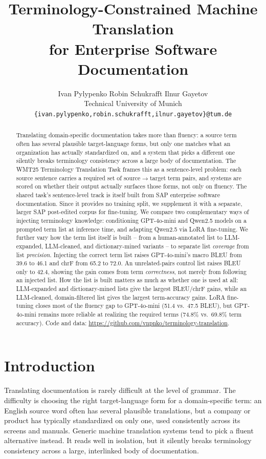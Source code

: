 \documentclass[11pt]{article}
\title{Terminology-Constrained Machine Translation \\ for Enterprise Software Documentation}
\author{Ivan Pylypenko \quad Robin Schukrafft \quad Ilnur Gayetov \\
  Technical University of Munich \\
  \texttt{\{ivan.pylypenko,robin.schukrafft,ilnur.gayetov\}@tum.de}}
\begin{document}
\maketitle

\begin{abstract}
Translating domain-specific documentation takes more than fluency: a source term often has several plausible target-language forms, but only one matches what an organization has actually standardized on, and a system that picks a different one silently breaks terminology consistency across a large body of documentation. The WMT25 Terminology Translation Task frames this as a sentence-level problem: each source sentence carries a required set of source$\to$target term pairs, and systems are scored on whether their output actually surfaces those forms, not only on fluency. The shared task's sentence-level track is itself built from SAP enterprise software documentation. Since it provides no training split, we supplement it with a separate, larger SAP post-edited corpus for fine-tuning. We compare two complementary ways of injecting terminology knowledge: conditioning GPT-4o-mini and Qwen2.5 models on a prompted term list at inference time, and adapting Qwen2.5 via LoRA fine-tuning. We further vary how the term list itself is built -- from a human-annotated list to LLM-expanded, LLM-cleaned, and dictionary-mined variants -- to separate list \emph{coverage} from list \emph{precision}. Injecting the correct term list raises GPT-4o-mini's macro BLEU from 39.6 to 46.1 and chrF from 65.2 to 72.0. An unrelated-pairs control list raises BLEU only to 42.4, showing the gain comes from term \emph{correctness}, not merely from following an injected list. How the list is built matters as much as whether one is used at all: LLM-expanded and dictionary-mined lists give the largest BLEU/chrF gains, while an LLM-cleaned, domain-filtered list gives the largest term-accuracy gains. LoRA fine-tuning closes most of the fluency gap to GPT-4o-mini (51.4 vs.\ 47.5 BLEU), but GPT-4o-mini remains more reliable at realizing the required terms (74.8\% vs.\ 69.8\% term accuracy). Code and data: \url{https://github.com/vnpnko/terminology-translation}.
\end{abstract}

\section{Introduction}
\label{sec:introduction}

Translating documentation is rarely difficult at the level of grammar. The difficulty is choosing the right target-language form for a domain-specific term: an English source word often has several plausible translations, but a company or product has typically standardized on only one, used consistently across its screens and manuals. Generic machine translation systems tend to pick a fluent alternative instead. It reads well in isolation, but it silently breaks terminology consistency across a large, interlinked body of documentation.
\end{document}
